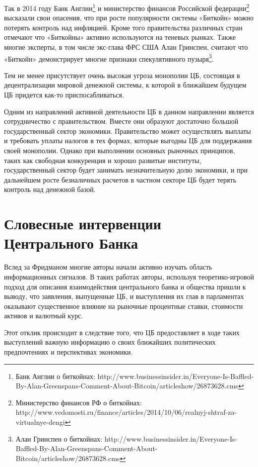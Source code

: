 \documentclass[14pt,a4paper, oneside]{extreport}
\theoremstyle{plain}              %
\theoremstyle{definition}         %
\begin{document}
Так в 2014 году Банк Англии\footnote{ Банк Англии о биткойнах: http://www.businessinsider.in/Everyone-Is-Baffled-By-Alan-Greenspans-Comment-About-Bitcoin/articleshow/26873628.cms} и министерство финансов Российской федерации\footnote{Министерство финансов РФ о биткойнах: http://www.vedomosti.ru/finance/articles/2014/10/06/realnyj-shtraf-za-virtualnye-dengi} высказали свои опасения, что при росте популярности системы «Биткойн»  можно потерять контроль над инфляцией.  Кроме того  правительства различных стран отмечают что «Биткойны» активно используются на теневых рынках. Также многие эксперты, в том числе экс-глава ФРС США Алан Гринспен, считают что «Биткойн» демонстрирует многие признаки спекулятивного пузыря\footnote{Алан Гринспен о биткойнах: http://www.businessinsider.in/Everyone-Is-Baffled-By-Alan-Greenspans-Comment-About-Bitcoin/articleshow/26873628.cms}.

Тем не менее присутствует очень высокая угроза монополии ЦБ, состоящая в децентрализации мировой денежной системы, к которой в ближайшем будущем ЦБ придется как-то приспосабливаться.

Одним из направлений активной деятельности ЦБ в данном направлении является сотрудничество с правительством. Вместе они образуют достаточно большой государственный сектор экономики. Правительство может осуществлять выплаты и требовать уплаты налогов в тех формах, которые выгодны ЦБ для поддержания своей монополии. Однако при выполнении основных рыночных принципов, таких как свободная конкуренция и хорошо развитые институты, государственный сектор будет занимать незначительную долю экономики, и при дальнейшем росте безналичных расчетов в частном секторе ЦБ будет терять контроль над денежной базой. 


\section{Словесные интервенции Центрального Банка}
Вслед за Фридманом многие авторы начали активно изучать область информационных сигналов. В таких работах авторы, используя теоретико-игровой подход для описания взаимодействия центрального банка и общества пришли к выводу, что заявления, выпущенные ЦБ, и выступления их глав в парламентах оказывают существенное влияние на рыночные процентные ставки, стоимости активов и валютный курс. 

Этот отклик происходит в следствие того, что ЦБ предоставляет в ходе таких выступлений важную информацию о своих ближайших политических предпочтениях и перспективах экономики. 
\end{document}
